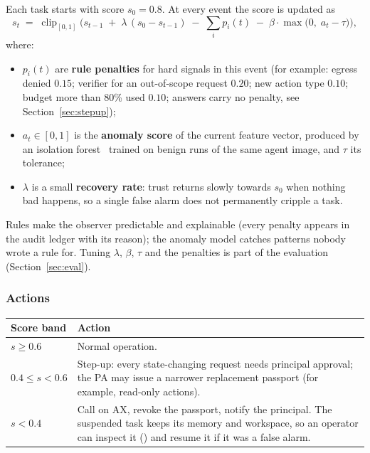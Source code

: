 Each task starts with score $s_0 = 0.8$. At every event the score is updated as
\[
  s_t \;=\; \operatorname{clip}_{[0,1]}\!\Big( s_{t-1} \;+\; \lambda\,(s_0 - s_{t-1}) \;-\; \sum_i p_i(t) \;-\; \beta \cdot \max\big(0,\; a_t - \tau\big) \Big),
\]
where:
\begin{itemize}
  \item $p_i(t)$ are \textbf{rule penalties} for hard signals in this event (for example: egress denied $0.15$; verifier  for an out-of-scope request $0.20$; new action type $0.10$; budget more than 80\% used $0.10$;  answers carry no penalty, see Section~\ref{sec:stepup});
  \item $a_t \in [0,1]$ is the \textbf{anomaly score} of the current feature vector, produced by an isolation forest~\cite{iforest} trained on benign runs of the same agent image, and $\tau$ its tolerance;
  \item $\lambda$ is a small \textbf{recovery rate}: trust returns slowly towards $s_0$ when nothing bad happens, so a single false alarm does not permanently cripple a task.
\end{itemize}

Rules make the observer predictable and explainable (every penalty appears in the audit ledger with its reason); the anomaly model catches patterns nobody wrote a rule for. Tuning $\lambda$, $\beta$, $\tau$ and the penalties is part of the evaluation (Section~\ref{sec:eval}).

\subsubsection{Actions}

\begin{center}
\small
\begin{tabularx}{\linewidth}{@{}L{3cm}Y@{}}
\toprule
\textbf{Score band} & \textbf{Action}\\
\midrule
$s \ge 0.6$ & Normal operation.\\
$0.4 \le s < 0.6$ & Step-up: every state-changing request needs principal approval; the PA may issue a narrower replacement passport (for example, read-only actions).\\
$s < 0.4$ & Call  on AX, revoke the passport, notify the principal. The suspended task keeps its memory and workspace, so an operator can inspect it () and resume it if it was a false alarm.\\
\bottomrule
\end{tabularx}
\end{center}

